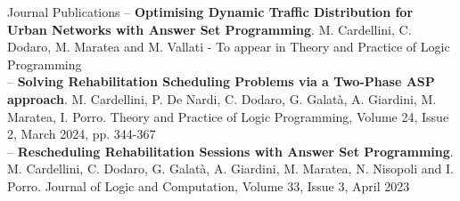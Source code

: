 \documentclass{resume} %
\begin{document}
\begin{rSection}{Journal Publications}
-- \textbf{Optimising Dynamic Traffic Distribution for Urban Networks with Answer Set Programming}. M. Cardellini, C. Dodaro, M. Maratea and M. Vallati - To appear in Theory and Practice of Logic Programming\\
-- \textbf{Solving Rehabilitation Scheduling Problems via a Two-Phase ASP approach}. M. Cardellini, P. De Nardi, C. Dodaro, G. Galat\`a, A. Giardini, M. Maratea, I. Porro. Theory and Practice of Logic Programming, Volume 24, Issue 2, March 2024, pp. 344-367\\
-- \textbf{Rescheduling Rehabilitation Sessions with Answer Set Programming}. M. Cardellini, C. Dodaro, G. Galat\`a, A. Giardini, M. Maratea, N. Nisopoli and I. Porro. Journal of Logic and Computation, Volume 33, Issue 3, April 2023
\end{rSection}
\end{document}
